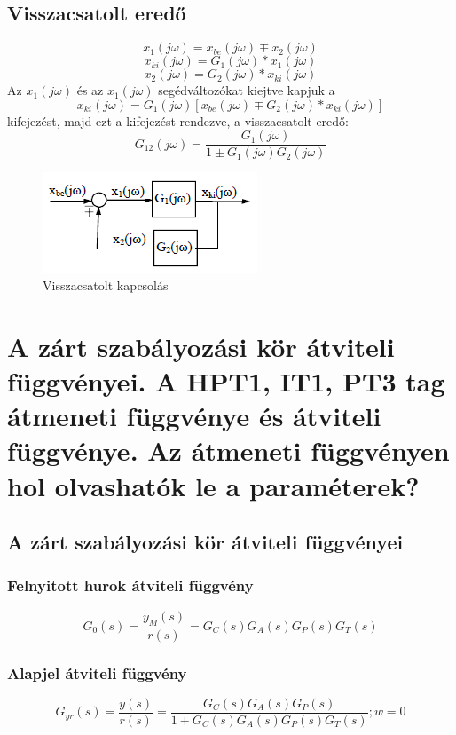 \documentclass[11pt,a4paper]{article}
\begin{document}
\subsection{Visszacsatolt eredő}
$$x_1\left(j\omega\right) = x_{be}\left(j\omega\right) \mp x_2\left(j\omega\right)$$
$$x_{ki}\left(j\omega\right) = G_1\left(j\omega\right) * x_1\left(j\omega\right)$$
$$x_2\left(j\omega\right) = G_2\left(j\omega\right) * x_{ki}\left(j\omega\right)$$
Az $x_1\left(j\omega\right)$ és az $x_1\left(j\omega\right)$ segédváltozókat kiejtve kapjuk a $$x_{ki}\left(j\omega\right) = G_1\left(j\omega\right)\left[x_{be}\left(j\omega\right) \mp G_2\left(j\omega\right) * x_{ki}\left(j\omega\right) \right]$$ kifejezést, majd ezt a kifejezést rendezve, a visszacsatolt eredő:
$$G_{12}\left(j\omega\right) = \frac{G_1\left(j\omega\right)}{1 \pm G_1\left(j\omega\right) G_2\left(j\omega\right)}$$
\begin{figure}[hbtp]
    	 \centering
		\includegraphics[scale=1.0]{38_visszacsatolt.png}
		\caption{Visszacsatolt kapcsolás}
\end{figure}
\section{A zárt szabályozási kör átviteli függvényei. A HPT1, IT1, PT3 tag átmeneti függvénye és átviteli függvénye. Az átmeneti függvényen hol olvashatók le a paraméterek?}
\subsection{A zárt szabályozási kör átviteli függvényei}
\subsubsection{Felnyitott hurok átviteli függvény}
$$G_0\left(s\right) = \frac{y_M\left(s\right)}{r\left(s\right)} = G_C\left(s\right)G_A\left(s\right)G_P\left(s\right)G_T\left(s\right)$$
\subsubsection{Alapjel átviteli függvény}
$$G_{yr}\left(s\right) = \frac{y\left(s\right)}{r\left(s\right)} = \frac{G_C\left(s\right)G_A\left(s\right)G_P\left(s\right)}{1+G_C\left(s\right)G_A\left(s\right)G_P\left(s\right)G_T\left(s\right)} ;w = 0$$
\end{document}
